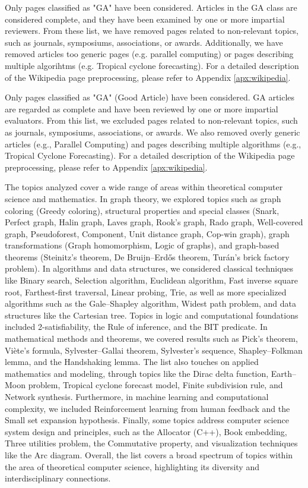 Only pages classified as "GA" have been considered. Articles in the GA class are considered complete, and they have been examined by one or more impartial reviewers. From these list, we have removed pages related to non-relevant topics, such as journals, symposiums, associations, or awards. Additionally, we have removed articles too generic pages (e.g. parallel computing) or pages describing multiple algorihtms (e.g. Tropical cyclone forecasting). For a detailed description of the Wikipedia page preprocessing, please refer to Appendix \ref{apx:wikipedia}.

Only pages classified as "GA" (Good Article) have been considered. GA articles are regarded as complete and have been reviewed by one or more impartial evaluators. From this list, we excluded pages related to non-relevant topics, such as journals, symposiums, associations, or awards. We also removed overly generic articles (e.g., Parallel Computing) and pages describing multiple algorithms (e.g., Tropical Cyclone Forecasting). For a detailed description of the Wikipedia page preprocessing, please refer to Appendix \ref{apx:wikipedia}.

The topics analyzed cover a wide range of areas within theoretical computer science and mathematics. In graph theory, we explored topics such as graph coloring (Greedy coloring), structural properties and special classes (Snark, Perfect graph, Halin graph, Laves graph, Rook's graph, Rado graph, Well-covered graph, Pseudoforest, Component, Unit distance graph, Cop-win graph), graph transformations (Graph homomorphism, Logic of graphs), and graph-based theorems (Steinitz's theorem, De Bruijn–Erdős theorem, Turán's brick factory problem). In algorithms and data structures, we considered classical techniques like Binary search, Selection algorithm, Euclidean algorithm, Fast inverse square root, Farthest-first traversal, Linear probing, Trie, as well as more specialized algorithms such as the Gale–Shapley algorithm, Widest path problem, and data structures like the Cartesian tree. Topics in logic and computational foundations included 2-satisfiability, the Rule of inference, and the BIT predicate. In mathematical methods and theorems, we covered results such as Pick's theorem, Viète's formula, Sylvester–Gallai theorem, Sylvester's sequence, Shapley–Folkman lemma, and the Handshaking lemma. The list also touches on applied mathematics and modeling, through topics like the Dirac delta function, Earth–Moon problem, Tropical cyclone forecast model, Finite subdivision rule, and Network synthesis. Furthermore, in machine learning and computational complexity, we included Reinforcement learning from human feedback and the Small set expansion hypothesis. Finally, some topics address computer science system design and principles, such as the Allocator (C++), Book embedding, Three utilities problem, the Commutative property, and visualization techniques like the Arc diagram. Overall, the list covers a broad spectrum of topics within the area of theoretical computer science, highlighting its diversity and interdisciplinary connections.

